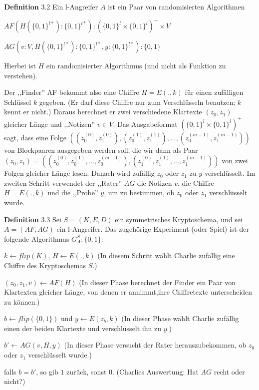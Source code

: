 \documentclass[a4paper]{article}
\begin{document}
\begin{multicols}{3}
    \textbf{Definition} 3.2 Ein l-Angreifer $A$ ist ein Paar von randomisierten Algorithmen
    \begin{itemize*}
        \item $AF(H(\{0,1\}^{l*}) :\{0,1\}^{l*}) : (\{0,1\}^l\times\{0,1\}^l)^+\times V$
        \item $AG(v:V,H(\{0,1\}^{l*}) :\{0,1\}^{l*},y:\{0,1\}^{l*}) :\{0,1\}$
    \end{itemize*}

    Hierbei ist $H$ ein randomisierter Algorithmus (und nicht als Funktion zu verstehen).

    Der ,,Finder'' AF bekommt also eine Chiffre $H=E(.,k)$ für einen zufälligen Schlüssel $k$ gegeben. (Er darf diese Chiffre nur zum Verschlüsseln benutzen; $k$ kennt er nicht.) Daraus berechnet er zwei verschiedene Klartexte $(z_0,z_1)$ gleicher Länge und ,,Notizen'' $v\in V$. Das Ausgabeformat $(\{0,1\}^l\times\{0,1\}^l)^+$ sagt, dass eine Folge $((z_0^{(0)},z^{(0)}_1),(z_0^{(1)},z_1^{(1)}),...,(z_0^{(m-1)},z_1^{(m-1)}))$ von Blockpaaren ausgegeben werden soll, die wir dann als Paar $(z_0 ,z_1) = ((z^{(0)}_0 ,z_0^{(1)},...,z_0^{(m-1)}),(z_1^{(0)},z^{(1)}_1 ,...,z_1^{(m-1)}))$ von zwei Folgen gleicher Länge lesen. Danach wird zufällig $z_0$ oder $z_1$ zu $y$ verschlüsselt.
    Im zweiten Schritt verwendet der ,,Rater'' $AG$ die Notizen $v$, die Chiffre $H=E(.,k)$ und die ,,Probe'' $y$, um zu bestimmen, ob $z_0$ oder $z_1$ verschlüsselt wurde.

    \textbf{Definition} 3.3 Sei $S=(K,E,D)$ ein symmetrisches Kryptoschema, und sei $A=(AF,AG)$ ein l-Angreifer. Das zugehörige Experiment (oder Spiel) ist der folgende Algorithmus $G^S_A:\{0,1\}:$
    \begin{enumerate*}
        \item $k\leftarrow flip(K)$, $H\leftarrow E(.,k)$ (In diesem Schritt wählt Charlie zufällig eine Chiffre des Kryptoschemas $S$.)
        \item $(z_0, z_1 ,v)\leftarrow AF(H)$ (In dieser Phase berechnet der Finder ein Paar von Klartexten gleicher Länge, von denen er annimmt,ihre Chiffretexte unterscheiden zu können.)
        \item $b\leftarrow flip(\{0,1\})$ und $y\leftarrow E(z_b,k)$ (In dieser Phase wählt Charlie zufällig einen der beiden Klartexte und verschlüsselt ihn zu $y$.)
        \item $b'\leftarrow AG(v,H,y)$ (In dieser Phase versucht der Rater herauszubekommen, ob $z_0$ oder $z_1$ verschlüsselt wurde.)
        \item falls $b=b'$, so gib $1$ zurück, sonst $0$. (Charlies Auswertung: Hat $AG$ recht oder nicht?)
    \end{enumerate*}


\end{multicols}
\end{document}
